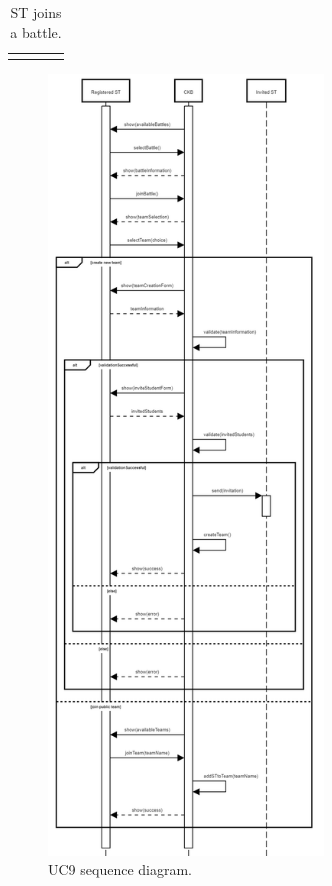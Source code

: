 \begin{center}
\begin{longtable}{l|p{0.75\linewidth}}
    \hline
    \caption{ST joins a battle.}
    \label{tab: ST_join_battle}
  \end{longtable}

  \begin{figure} [H]
    \begin{center}
        \includegraphics[width=0.65\textwidth,height=\textheight,keepaspectratio]{Images/UseCaseDiagrams/UC9.png}
        \caption{UC9 sequence diagram.}
        \label{fig: UC9_sequence_diagram}
    \end{center}
  \end{figure}
\end{center}


